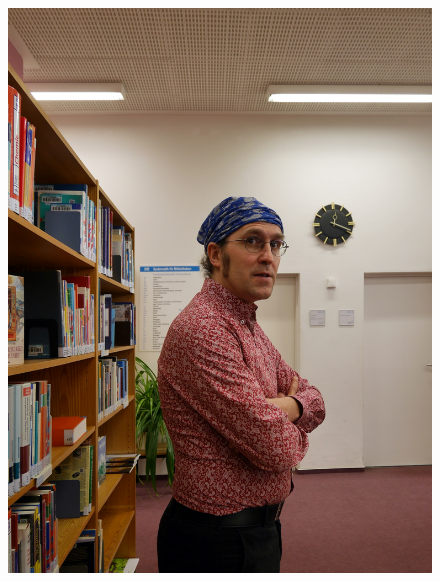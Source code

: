\documentclass[a4paper,
fontsize=11pt,
oneside,
numbers=noperiodatend,
parskip=half-,
bibliography=totoc,
final
]{scrartcl}
\begin{document}
\begin{figure}
\centering
\includegraphics{img/danilo-bibliothek-2.jpg}
\end{figure}
\end{document}
